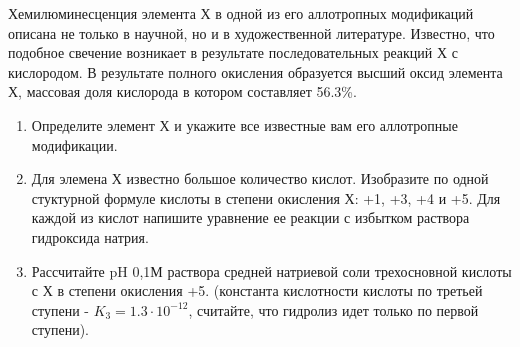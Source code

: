 
Хемилюминесценция элемента Х в одной из его аллотропных модификаций  описана не только в научной, но и в 
художественной литературе. Известно, что подобное свечение возникает в результате последовательных реакций Х с 
кислородом. В результате полного окисления образуется высший оксид элемента Х, массовая доля кислорода в котором 
составляет 56.3\%. 

\begin{enumerate}
    \item Определите элемент Х и укажите все известные вам его аллотропные модификации. 
    \item Для элемена Х известно большое количество кислот. Изобразите по одной стуктурной формуле кислоты в 
    степени окисления Х: +1, +3, +4 и +5. Для каждой из кислот напишите уравнение ее реакции с избытком раствора 
    гидроксида натрия.
    \item Рассчитайте pH 0,1М раствора средней натриевой соли трехосновной кислоты с Х в степени окисления +5. 
    (константа кислотности  кислоты по третьей ступени - $K_3=1.3 \cdot 10^{-12}$, считайте, что гидролиз идет только по первой ступени).   
\end{enumerate}

